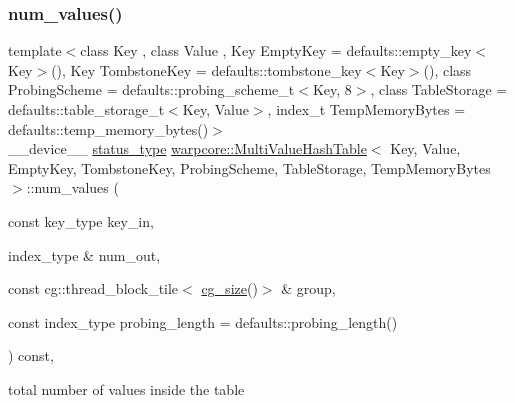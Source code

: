 \subsubsection{\texorpdfstring{num\+\_\+values()}{num\_values()}\hspace{0.1cm}{\footnotesize\ttfamily [1/3]}}
{\footnotesize\ttfamily template$<$class Key , class Value , Key Empty\+Key = defaults\+::empty\+\_\+key$<$\+Key$>$(), Key Tombstone\+Key = defaults\+::tombstone\+\_\+key$<$\+Key$>$(), class Probing\+Scheme  = defaults\+::probing\+\_\+scheme\+\_\+t$<$\+Key, 8$>$, class Table\+Storage  = defaults\+::table\+\_\+storage\+\_\+t$<$\+Key, Value$>$, index\+\_\+t Temp\+Memory\+Bytes = defaults\+::temp\+\_\+memory\+\_\+bytes()$>$ \\
\+\_\+\+\_\+device\+\_\+\+\_\+ \hyperlink{classwarpcore_1_1Status}{status\+\_\+type} \hyperlink{classwarpcore_1_1MultiValueHashTable}{warpcore\+::\+Multi\+Value\+Hash\+Table}$<$ Key, Value, Empty\+Key, Tombstone\+Key, Probing\+Scheme, Table\+Storage, Temp\+Memory\+Bytes $>$\+::num\+\_\+values (\begin{DoxyParamCaption}\item[{const key\+\_\+type}]{key\+\_\+in,  }\item[{index\+\_\+type \&}]{num\+\_\+out,  }\item[{const cg\+::thread\+\_\+block\+\_\+tile$<$ \hyperlink{classwarpcore_1_1MultiValueHashTable_ad300c5a01bd933343ff08176fb4b4e29}{cg\+\_\+size}()$>$ \&}]{group,  }\item[{const index\+\_\+type}]{probing\+\_\+length = {\ttfamily defaults\+:\+:probing\+\_\+length()} }\end{DoxyParamCaption}) const\hspace{0.3cm}{\ttfamily [inline]}, {\ttfamily [noexcept]}}



total number of values inside the table 


